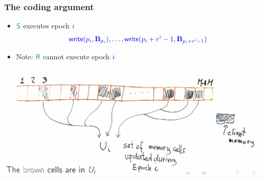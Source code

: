 \documentclass[]{beamer}
\newcommand{\Sender}{\color{teal} \mathsf{S}}
\newcommand{\Receiver}{\color{teal} \mathsf{R}}
\newcommand{\wri}{\mathsf{write}}
\newcommand{\bB}{\mathbf{B}}
\begin{document}
\begin{frame}

\frametitle{The coding argument}
\begin{itemize}
\item $\Sender$ executes 
epoch $\color{blue}i$
$$\color{blue}\wri(p_i,\bB_{p_i}),\ldots,\wri(p_i+r^i-1,\bB_{p_i+r^i-1})$$
\item Note: $\Receiver$ cannot execute 
epoch $\color{blue}i$
\end{itemize}

\vfill

\begin{center}
\includegraphics[width=\textwidth]{Images/memory02-A.pdf}
\end{center}

\end{frame}
\end{document}
